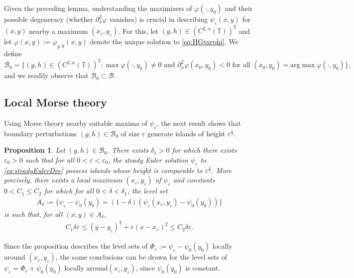 \documentclass[11pt,reqno]{amsproc}
\newtheorem{proposition}{Proposition}[section]
\newcommand{\ve}{\varepsilon}
\numberwithin{equation}{section}
\numberwithin{theorem}{section}
\numberwithin{prop}{section}
\numberwithin{cor}{section}
\numberwithin{lemma}{section}
\theoremstyle{remark}
\theoremstyle{definition}
\begin{document}
Given the preceding lemma, understanding the maximizers of  $\varphi(\cdot,y_0)$ and their possible degeneracy (whether $\partial_x^2\varphi$ vanishes) is crucial in describing $\psi_\ve(x,y)$ for $(x,y)$ nearby a maximum $(x_\ve,y_\ve)$.  For this, let $(g,h)\in (C^{2,\alpha}(\mathbb{T}))^2$ and let $\varphi(x,y):=\varphi_{g,h}(x,y)$ denote the unique solution to \eqref{eq:HGvarphi}. We define
\begin{equation}\label{eq:defB0}
\mathcal{B}_0 = \lbrace (g,h) \in (C^{2,\alpha}(\mathbb{T}))^2 : \max\varphi(\cdot,y_0)\neq 0 \text{ and }\partial_x^2\varphi(x_0,y_0)< 0 \text{ for all } (x_0, y_0)=\text{arg}\max\varphi(\cdot,y_0) \rbrace,
\end{equation}
and we readily observe that $\mathcal{B}_0\subset \mathcal{B}$.
\subsection{Local Morse theory}
Using Morse theory nearby suitable maxima of $\psi_\ve$, the next result shows that boundary perturbations $(g,h)\in \mathcal{B}_0$ of size $\ve$ generate islands of height $\ve^\frac12$.
\begin{proposition}\label{prop:islandsize}
Let $(g,h)\in \mathcal{B}_0$. There exists $\delta_1>0$ for which there exists $\ve_0>0$ such that for all $0< \ve < \ve_0$, the steady Euler solution $\psi_\ve$ to \eqref{eq:steadyEulerDve} possess islands whose height is comparable to $\ve^\frac12$. More precisely, there exists a local maximum $(x_\ve,y_\ve)$ of $\psi_\ve$ and constants $0<C_1\leq C_2$ for which for all $0< \delta< \delta_1$, the level set 
\begin{align*}
A_\delta:=\lbrace \psi_\ve-\psi_0(y_0) = (1-\delta)(\psi_\ve(x_\ve,y_\ve) -\psi_0(y_0) ) \rbrace
\end{align*}
is such that, for all $(x,y)\in A_\delta$,
\begin{align*}
C_1\delta \ve \leq (y-y_\ve)^2 + \ve (x-x_\ve)^2 \leq C_2\delta\ve.
\end{align*}
\end{proposition}
Since the proposition describes the level sets of $\Phi_\ve:=\psi_\ve-\psi_0(y_0)$ locally around $(x_\ve,y_\ve)$, the same conclusions can be drawn for the level sets of $\psi_\ve=\Phi_\ve + \psi_0(y_0)$ locally around$(x_\ve,y_\ve)$, since $\psi_0(y_0)$ is constant.
\end{document}
